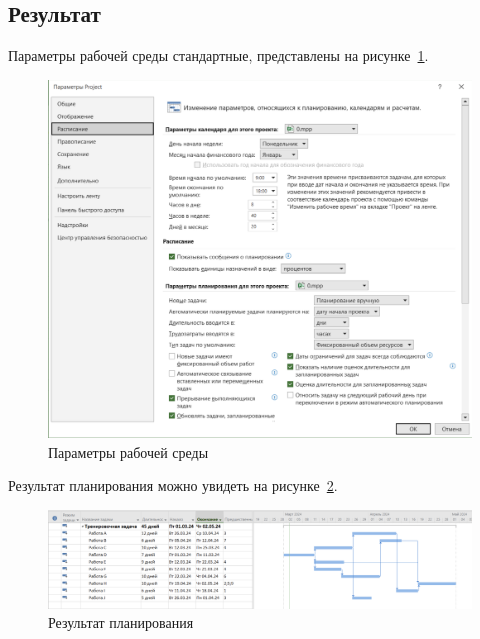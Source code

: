 \newpage 
\subsection*{Результат}

Параметры рабочей среды стандартные, представлены на рисунке~\ref{fig:u1}.

\begin{figure}[h!]
	\begin{center}
		\includegraphics[scale=0.45]{inc/img/p_2.png}
	\end{center}
	\captionsetup{justification=centering}
	\caption{Параметры рабочей среды}
	\label{fig:u1}
\end{figure}

Результат планирования можно увидеть на рисунке~\ref{fig:u2}.

\begin{figure}[h!]
	\begin{center}
		\includegraphics[scale=0.38]{inc/img/p_1.png}
	\end{center}
	\captionsetup{justification=centering}
	\caption{Результат планирования}
	\label{fig:u2}
\end{figure}

